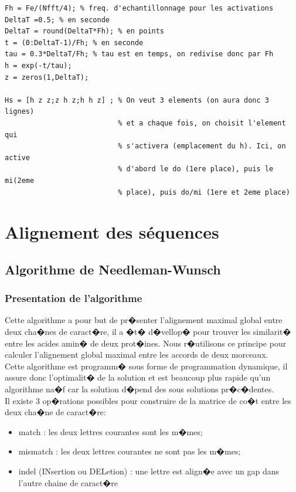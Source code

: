 \documentclass[12pt,a4paper]{article}
\begin{document}
\begin{lstlisting}
Fh = Fe/(Nfft/4); % freq. d'echantillonnage pour les activations
DeltaT =0.5; % en seconde
DeltaT = round(DeltaT*Fh); % en points
t = (0:DeltaT-1)/Fh; % en seconde
tau = 0.3*DeltaT/Fh; % tau est en temps, on redivise donc par Fh
h = exp(-t/tau);
z = zeros(1,DeltaT);

Hs = [h z z;z h z;h h z] ; % On veut 3 elements (on aura donc 3 lignes)
                           % et a chaque fois, on choisit l'element qui
                           % s'activera (emplacement du h). Ici, on active
                           % d'abord le do (1ere place), puis le mi(2eme
                           % place), puis do/mi (1ere et 2eme place)
\end{lstlisting}



\section{Alignement des séquences}
\subsection{Algorithme de Needleman-Wunsch}
\subsubsection{Presentation de l'algorithme}
Cette algorithme a pour but de pr�senter l'alignement maximal global entre deux cha�nes de caract�re, il a �t� d�vellop�
pour trouver les similarit� entre les acides amin� de deux prot�ines. Nous r�utilisons ce principe pour calculer l'alignement global maximal entre les accords de deux morceaux.\\
Cette algorithme est programm� sous forme de programmation dynamique, il assure donc l'optimalit� de la solution et est beaucoup plus rapide qu'un algorithme na�f car la solution d�pend des sous solutions pr�c�dentes.\\
Il existe 3 op�rations possibles pour  construire de la matrice de co�t entre les deux cha�ne de caract�re:
 \begin{itemize}
\item match : les deux lettres courantes sont les m�mes;
\item mismatch : les deux lettres courantes ne sont pas les m�mes;
\item indel (INsertion ou DELetion) : une lettre est align�e avec un gap dans l'autre chaine de caract�re
\end{itemize}
\end{document}
